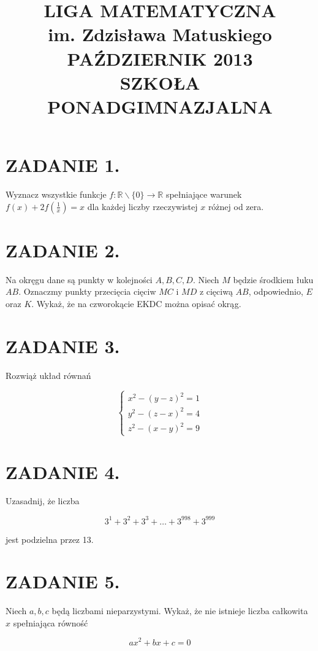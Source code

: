 \documentclass[10pt]{article}
\title{LIGA MATEMATYCZNA \\
 im. Zdzisława Matuskiego \\
 PAŹDZIERNIK 2013 \\
 SZKOŁA PONADGIMNAZJALNA }
\author{}
\date{}
\begin{document}
\maketitle
\section*{ZADANIE 1.}
Wyznacz wszystkie funkcje \(f: \mathbb{R} \backslash\{0\} \rightarrow \mathbb{R}\) spełniające warunek \(f(x)+2 f\left(\frac{1}{x}\right)=x\) dla każdej liczby rzeczywistej \(x\) różnej od zera.

\section*{ZADANIE 2.}
Na okręgu dane są punkty w kolejności \(A, B, C, D\). Niech \(M\) będzie środkiem łuku \(A B\). Oznaczmy punkty przecięcia cięciw \(M C\) i \(M D\) z cięciwą \(A B\), odpowiednio, \(E\) oraz \(K\). Wykaż, że na czworokącie EKDC można opisać okrąg.

\section*{ZADANIE 3.}
Rozwiąż układ równań

\[
\left\{\begin{array}{l}
x^{2}-(y-z)^{2}=1 \\
y^{2}-(z-x)^{2}=4 \\
z^{2}-(x-y)^{2}=9
\end{array}\right.
\]

\section*{ZADANIE 4.}
Uzasadnij, że liczba

\[
3^{1}+3^{2}+3^{3}+\ldots+3^{998}+3^{999}
\]

jest podzielna przez 13.

\section*{ZADANIE 5.}
Niech \(a, b, c\) będą liczbami nieparzystymi. Wykaż, że nie istnieje liczba całkowita \(x\) spełniająca równość

\[
a x^{2}+b x+c=0
\]
\end{document}
